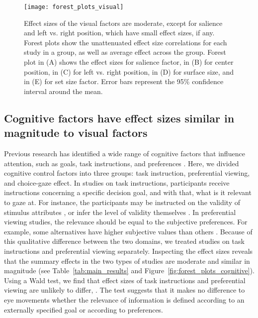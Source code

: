 


\begin{figure}[!h]
\texttt{[image: forest\_plots\_visual]}
\centering
\caption{Effect sizes of the visual factors are moderate, except for salience and left vs. right position, which have small effect sizes, if any. Forest plots show the unattenuated effect size correlations for each study in a group, as well as average effect across the group. Forest plot in (A) shows the effect sizes for salience factor, in (B) for center position, in (C) for left vs. right position, in  (D) for surface size, and in (E) for set size factor. Error bars represent the 95\% confidence interval around the mean.}
\label{fig:forest_plots_visual}
\end{figure}


\subsection{Cognitive factors have effect sizes similar in magnitude to visual factors}

Previous research has identified a wide range of cognitive factors that influence attention, such as goals, task instructions, and preferences \citep[for a review see][]{orquin2013a}. Here, we divided cognitive control factors into three groups: task instruction, preferential viewing, and choice-gaze effect. In studies on task instructions, participants receive instructions concerning a specific decision goal, and with that, what is it relevant to gaze at. For instance, the participants may be instructed on the validity of stimulus attributes \citep{krefeld-schwalb2019a}, or infer the level of validity themselves \citep{bialkova2014a}. In preferential viewing studies, the relevance should be equal to the subjective preferences. For example, some alternatives have higher subjective values than others \citep{kim2012a}. Because of this qualitative difference between the two domains, we treated studies on task instructions and preferential viewing separately. 
Inspecting the effect sizes reveals that the summary effects in the two types of studies are moderate and similar in magnitude (see Table~\ref{tab:main_results} and Figure~\ref{fig:forest_plots_cognitive}). Using a Wald test, we find that effect sizes of task instructions and preferential viewing are unlikely to differ, . 
The test suggests that it makes no difference to eye movements whether the relevance of information is defined according to an externally specified goal or according to preferences. 

